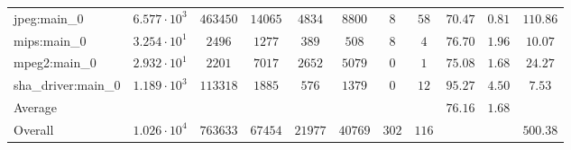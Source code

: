\begin{tabular}{|l|c|c|c|c|c|c|c|c|c|c|}
jpeg:main\_0            & $ 6.577 \cdot 10^{3} $ & $ 463450 $ & $ 14065 $ & $ 4834  $ & $ 8800  $ & $ 8   $ & $ 58  $ & $ 70.47       $ & $ 0.81    $ & $ 110.86  $ \\
mips:main\_0            & $ 3.254 \cdot 10^{1} $ & $ 2496   $ & $ 1277  $ & $ 389   $ & $ 508   $ & $ 8   $ & $ 4   $ & $ 76.70       $ & $ 1.96    $ & $ 10.07   $ \\
mpeg2:main\_0           & $ 2.932 \cdot 10^{1} $ & $ 2201   $ & $ 7017  $ & $ 2652  $ & $ 5079  $ & $ 0   $ & $ 1   $ & $ 75.08       $ & $ 1.68    $ & $ 24.27   $ \\
sha\_driver:main\_0     & $ 1.189 \cdot 10^{3} $ & $ 113318 $ & $ 1885  $ & $ 576   $ & $ 1379  $ & $ 0   $ & $ 12  $ & $ 95.27       $ & $ 4.50    $ & $ 7.53    $ \\
\hline
Average                 & $                    $ & $        $ & $       $ & $       $ & $       $ & $     $ & $     $ & $ 76.16       $ & $ 1.68    $ & $         $ \\
\hline
Overall                 & $ 1.026 \cdot 10^{4} $ & $ 763633 $ & $ 67454 $ & $ 21977 $ & $ 40769 $ & $ 302 $ & $ 116 $ & $             $ & $         $ & $ 500.38  $ \\
\hline
\end{tabular}
